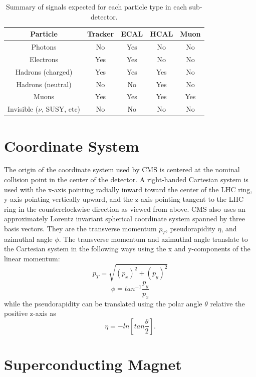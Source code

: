 \begin{table}[h]
	\centering
\begin{tabular}{|c|c|c|c|c|}
	\hline 
	Particle & Tracker & ECAL & HCAL & Muon \\ 
	\hline 
	Photons & No & Yes & No & No \\ 
	\hline 
	Electrons & Yes & Yes & No & No \\ 
	\hline 
	Hadrons (charged) & Yes & Yes & Yes & No \\ 
	\hline 
	Hadrons (neutral) & No & No & Yes & No \\ 
	\hline 
	Muons & Yes & Yes & Yes & Yes \\ 
	\hline 
	Invisible ($\nu$, SUSY, etc) & No & No & No & No \\ 
	\hline 
\end{tabular} 
\caption{Summary of signals expected for each particle type in each sub-detector.}
\label{table:subdetsignals}
\end{table}


\section{Coordinate System}
The origin of the coordinate system used by CMS is centered at the nominal collision point in the center of the detector.  A right-handed Cartesian system is used with the x-axis pointing radially inward toward the center of the LHC ring, y-axis pointing vertically upward, and the z-axis pointing tangent to the LHC ring in the counterclockwise direction as viewed from above.  CMS also uses an approximately Lorentz invariant spherical coordinate system spanned by three basis vectors.  They are the transverse momentum $p_{T}$, pseudorapidity $\eta$, and azimuthal angle $\phi$.  The transverse momentum and azimuthal angle translate to the Cartesian system in the following ways using the x and y-components of the linear momentum:
\begin{equation}
p_{T} = \sqrt{(p_{x})^{2} + (p_{y})^{2}}
\end{equation}
\begin{equation}
\phi = tan^{-1}\frac{p_{y}}{p_{x}}
\end{equation}
while the pseudorapidity can be translated using the polar angle $\theta$ relative the positive z-axis as
\begin{equation}
\eta = -ln[tan\frac{\theta}{2}].
\end{equation}

\section{Superconducting Magnet}

